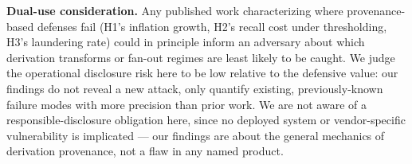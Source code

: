 \textbf{Dual-use consideration.} Any published work characterizing
where provenance-based defenses fail (H1's inflation growth, H2's
recall cost under thresholding, H3's laundering rate) could in
principle inform an adversary about which derivation transforms or
fan-out regimes are least likely to be caught. We judge the
operational disclosure risk here to be low relative to the defensive
value: our findings do not reveal a new attack, only quantify
existing, previously-known failure modes with more precision than
prior work. We are not aware of a responsible-disclosure obligation
here, since no deployed system or vendor-specific vulnerability is
implicated --- our findings are about the general mechanics of
derivation provenance, not a flaw in any named product.
